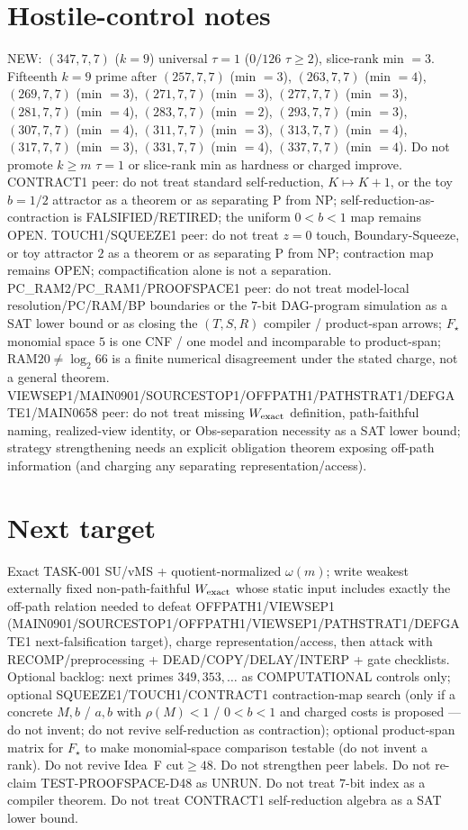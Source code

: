 \documentclass[11pt]{article}
\begin{document}
\section*{Hostile-control notes}
NEW: $(347,7,7)$ ($k{=}9$) universal $\tau{=}1$ ($0/126$ $\tau{\ge}2$), slice-rank min $=3$.
Fifteenth $k{=}9$ prime after $(257,7,7)$ (min $=3$), $(263,7,7)$ (min $=4$), $(269,7,7)$ (min $=3$), $(271,7,7)$ (min $=3$), $(277,7,7)$ (min $=3$), $(281,7,7)$ (min $=4$), $(283,7,7)$ (min $=2$), $(293,7,7)$ (min $=3$), $(307,7,7)$ (min $=4$), $(311,7,7)$ (min $=3$), $(313,7,7)$ (min $=4$), $(317,7,7)$ (min $=3$), $(331,7,7)$ (min $=4$), $(337,7,7)$ (min $=4$).
Do not promote $k{\ge}m$ $\tau{=}1$ or slice-rank min as hardness or charged improve.
CONTRACT1 peer: do not treat standard self-reduction, $K\mapsto K+1$, or the toy $b{=}1/2$ attractor as a theorem or as separating P from NP;
self-reduction-as-contraction is FALSIFIED/RETIRED; the uniform $0{<}b{<}1$ map remains OPEN.
TOUCH1/SQUEEZE1 peer: do not treat $z{=}0$ touch, Boundary-Squeeze, or toy attractor $2$ as a theorem or as separating P from NP;
contraction map remains OPEN; compactification alone is not a separation.
PC\_RAM2/PC\_RAM1/PROOFSPACE1 peer: do not treat model-local resolution/PC/RAM/BP boundaries or the $7$-bit DAG-program simulation as a SAT lower bound
or as closing the $(T,S,R)$ compiler / product-span arrows; $F_\star$ monomial space $5$ is one CNF / one model and incomparable to product-span;
RAM$20\neq\log_2 66$ is a finite numerical disagreement under the stated charge, not a general theorem.
VIEWSEP1/MAIN0901/SOURCESTOP1/OFFPATH1/PATHSTRAT1/DEFGATE1/MAIN0658 peer: do not treat missing $W_{\rm exact}$ definition,
path-faithful naming, realized-view identity, or Obs-separation necessity as a SAT lower bound;
strategy strengthening needs an explicit obligation theorem exposing off-path information
(and charging any separating representation/access).

\section*{Next target}
Exact TASK-001 SU/vMS + quotient-normalized $\omega(m)$; write weakest externally fixed non-path-faithful
$W_{\rm exact}$ whose static input includes exactly the off-path relation needed to defeat OFFPATH1/VIEWSEP1
(MAIN0901/SOURCESTOP1/OFFPATH1/VIEWSEP1/PATHSTRAT1/DEFGATE1 next-falsification target), charge representation/access,
then attack with RECOMP/preprocessing + DEAD/COPY/DELAY/INTERP + gate checklists.
Optional backlog: next primes $349,353,\ldots$ as COMPUTATIONAL controls only;
optional SQUEEZE1/TOUCH1/CONTRACT1 contraction-map search (only if a concrete $M,b$ / $a,b$ with $\rho(M){\lt}1$ / $0{<}b{<}1$ and charged costs is proposed --- do not invent; do not revive self-reduction as contraction);
optional product-span matrix for $F_\star$ to make monomial-space comparison testable (do not invent a rank).
Do not revive Idea~F cut$\ge48$. Do not strengthen peer labels.
Do not re-claim TEST-PROOFSPACE-D48 as UNRUN.
Do not treat $7$-bit index as a compiler theorem.
Do not treat CONTRACT1 self-reduction algebra as a SAT lower bound.
\end{document}
